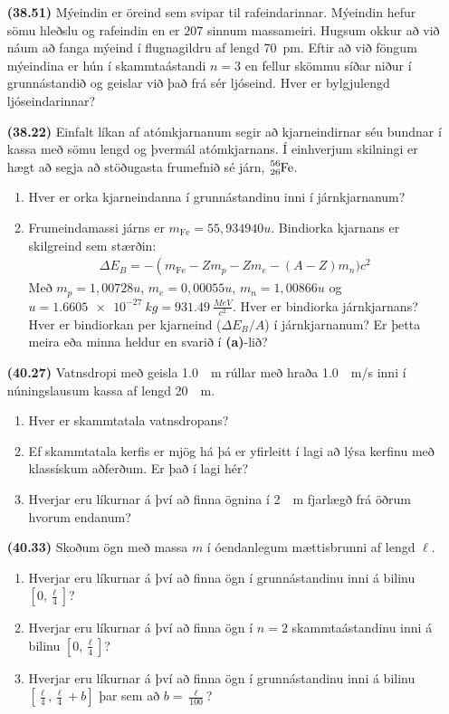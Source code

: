 \ifdefined \wholebook \else\documentclass[oneside]{book}\usepackage{EdlBook}\graphicspath{{figures/}}
\begin{document}
\begin{enumerate}[label = \textbf{(\alph*)}]

\item[\textbf{(38.51)}] Mýeindin er öreind sem svipar til rafeindarinnar. Mýeindin hefur sömu hleðslu og rafeindin en er $207$ sinnum massameiri. Hugsum okkur að við náum að fanga mýeind í flugnagildru af lengd \SI{70}{pm}. Eftir að við föngum mýeindina er hún í skammtaástandi $n = 3$ en fellur skömmu síðar niður í grunnástandið og geislar við það frá sér ljóseind. Hver er bylgjulengd ljóseindarinnar?

\item[\textbf{(38.22)}] Einfalt líkan af atómkjarnanum segir að kjarneindirnar séu bundnar í kassa með sömu lengd og þvermál atómkjarnans. Í einhverjum skilningi er hægt að segja að stöðugasta frumefnið sé járn, $\ce{_{26}^{56}Fe}$.
\begin{enumerate}[label = \textbf{(\alph*)}]
    \item Hver er orka kjarneindanna í grunnástandinu inni í járnkjarnanum?
    \item Frumeindamassi járns er $m_{\text{Fe}} = 55,934940u$. Bindiorka kjarnans er skilgreind sem stærðin:
    \begin{align*}
        \Delta E_B = -\left( m_{\text{Fe}} - Zm_p - Z m_e - (A-Z)m_n)c^2
    \end{align*}
    Með $m_p = 1,00728u$, $m_e = 0,00055u$, $m_n = 1,00866u$ og $u = \SI{1.6605e-27}{kg} = \SI{931.49}{\frac{MeV}{c^2}}$. Hver er bindiorka járnkjarnans? Hver er bindiorkan per kjarneind ($\Delta E_B / A$) í járnkjarnanum? Er þetta meira eða minna heldur en svarið í \textbf{(a)}-lið?
\end{enumerate}


\item[\textbf{(40.27)}] Vatnsdropi með geisla \SI{1.0}{\mu m} rúllar með hraða \SI{1.0}{\mu m/s} inni í núningslausum kassa af lengd \SI{20}{\mu m}. \begin{enumerate}[label = \textbf{(\alph*)}]
    \item Hver er skammtatala vatnsdropans?
    \item Ef skammtatala kerfis er mjög há þá er yfirleitt í lagi að lýsa kerfinu með klassískum aðferðum. Er það í lagi hér?
    \item Hverjar eru líkurnar á því að finna ögnina í \SI{2}{\mu m} fjarlægð frá öðrum hvorum endanum?
\end{enumerate}

\item[\textbf{(40.33)}] Skoðum ögn með massa $m$ í óendanlegum mættisbrunni af lengd $\ell$. 
\begin{enumerate}[label = \textbf{(\alph*)}]
    \item Hverjar eru líkurnar á því að finna ögn í grunnástandinu inni á bilinu $[0,\frac{\ell}{4}]$?
    \item Hverjar eru líkurnar á því að finna ögn í $n = 2$ skammtaástandinu inni á bilinu $[0,\frac{\ell}{4}]$?
    \item Hverjar eru líkurnar á því að finna ögn í grunnástandinu inni á bilinu $[\frac{\ell}{4}, \frac{\ell}{4} + b]$ þar sem að $b = \frac{\ell}{100}$?
\end{enumerate}


\end{enumerate}
\end{document}
